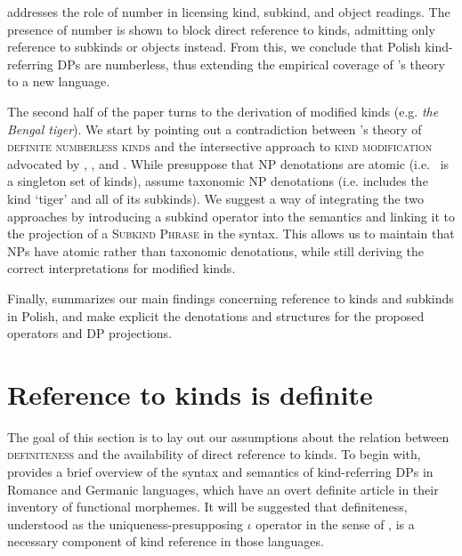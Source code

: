 \documentclass[output=paper,
colorlinks,
citecolor=brown,
newtxmath
]{langscibook}
\begin{document}
 addresses the role of number in licensing kind, subkind, and object readings. The presence of number is shown to block direct reference to kinds, admitting only reference to subkinds or objects instead. From this, we conclude that Polish kind-referring DPs are numberless, thus extending the empirical coverage of \citeauthor{Borik.Espinal2012}'s theory to a new language.

The second half of the paper turns to the derivation of modified kinds (e.g. \textit{the Bengal tiger}). We start   by pointing out a contradiction between \citeauthor{Borik.Espinal2012}'s theory of \textsc{definite numberless kinds} and the intersective approach to \textsc{kind modification} advocated by \citet{McNally.Boleda2004}, \citet{Wagiel2014}, and \citet{Borik.Espinal2015}. While \citeauthor{Borik.Espinal2012} presuppose that NP denotations are atomic (i.e.\  is a singleton set of kinds), \citet{McNally.Boleda2004} assume taxonomic NP denotations (i.e.  includes the kind `tiger' and all of its subkinds). We suggest a way of integrating the two approaches by introducing a subkind operator  into the semantics and linking it to the projection of a \textsc{Subkind Phrase} in the syntax. This allows us to maintain that NPs have atomic rather than taxonomic denotations, while still deriving the correct interpretations for modified kinds.

Finally,  summarizes our main findings concerning reference to kinds and subkinds in Polish, and make explicit the denotations and structures for the proposed operators and DP projections.


\section{Reference to kinds is definite}\label{sec:2-nominals-def}

The goal of this section is to lay out our assumptions about the relation between \textsc{definiteness} and the availability of direct reference to kinds. To begin with,  provides a brief overview of the syntax and semantics of kind-referring DPs in Romance and Germanic languages, which have an overt definite article in their inventory of functional morphemes. It will be suggested that definiteness, understood as the uniqueness-presupposing $\iota$ operator in the sense of \citet{Partee1987}, is a necessary component of kind reference in those languages.
\end{document}
